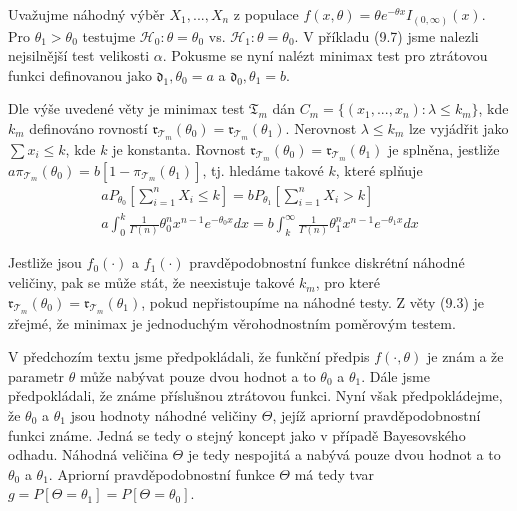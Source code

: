 \begin{example}
Uvažujme náhodný výběr $X_1, ..., X_n$ z populace $f(x, \theta) = \theta e^{-\theta x}I_{(0, \infty)}(x)$. Pro $\theta_1 > \theta_0$ testujme $\mathscr{H}_0: \theta = \theta_0$ vs. $\mathscr{H}_1: \theta = \theta_0$. V příkladu (9.7) jsme nalezli nejsilnější test velikosti $\alpha$. Pokusme se nyní nalézt minimax test pro ztrátovou funkci definovanou jako $\mathfrak{d_1, \theta_0} = a$ a $\mathfrak{d_0, \theta_1} = b$.

Dle výše uvedené věty je minimax test $\mathfrak{T}_m$ dán $C_m = \{(x_1, ..., x_n): \lambda \le k_m\}$, kde $k_m$ definováno rovností $\mathfrak{r}_{\mathscr{T}_m}(\theta_0) = \mathfrak{r}_{\mathscr{T}_m}(\theta_1)$. Nerovnost $\lambda \le k_m$ lze vyjádřit jako $\sum x_i \le k$, kde $k$ je konstanta. Rovnost $\mathfrak{r}_{\mathscr{T}_m}(\theta_0) = \mathfrak{r}_{\mathscr{T}_m}(\theta_1)$ je splněna, jestliže $a \pi_{\mathscr{T}_m}(\theta_0) = b[1 - \pi_{\mathscr{T}_m}(\theta_1)]$, tj. hledáme takové $k$, které splňuje
\begin{gather*}
a P_{\theta_0}[\sum_{i = 1}^n X_i \le k] = b P_{\theta_1}[\sum_{i = 1}^n X_i > k]\\
a \int_0^k \frac{1}{\Gamma(n)}\theta_0^n x^{n - 1}e^{-\theta_0 x}dx = b \int_k^{\infty}\frac{1}{\Gamma(n)}\theta_1^n x^{n - 1}e^{-\theta_1 x}dx
\end{gather*}
\end{example}

Jestliže jsou $f_0(\cdot)$ a $f_1(\cdot)$ pravděpodobnostní funkce diskrétní náhodné veličiny, pak se může stát, že neexistuje takové $k_m$, pro které $\mathfrak{r}_{\mathscr{T}_m}(\theta_0) = \mathfrak{r}_{\mathscr{T}_m}(\theta_1)$, pokud nepřistoupíme na náhodné testy. Z věty (9.3) je zřejmé, že minimax je jednoduchým věrohodnostním poměrovým testem.

V předchozím textu jsme předpokládali, že funkční předpis $f(\cdot, \theta)$ je znám a že parametr $\theta$ může nabývat pouze dvou hodnot a to $\theta_0$ a $\theta_1$. Dále jsme předpokládali, že známe příslušnou ztrátovou funkci. Nyní však předpokládejme, že $\theta_0$ a $\theta_1$ jsou hodnoty náhodné veličiny $\Theta$, jejíž apriorní pravděpodobnostní funkci známe. Jedná se tedy o stejný koncept jako v případě Bayesovského odhadu. Náhodná veličina $\Theta$ je tedy nespojitá a nabývá pouze dvou hodnot a to $\theta_0$ a $\theta_1$. Apriorní pravděpodobnostní funkce $\Theta$ má tedy tvar $g = P[\Theta = \theta_1] = P[\Theta = \theta_0]$.


